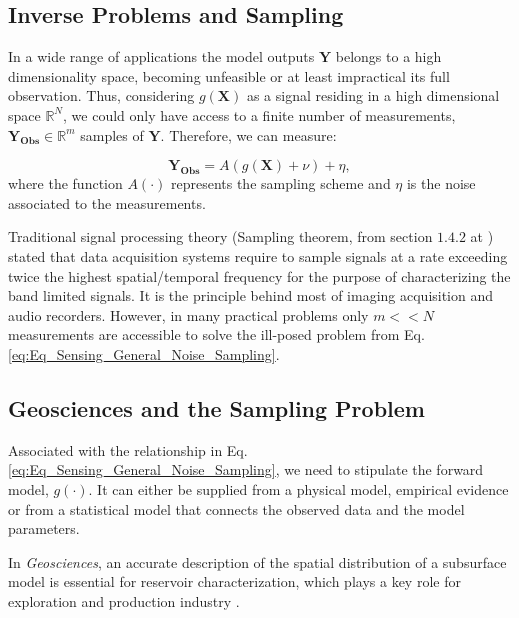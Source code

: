 \subsection{Inverse Problems and Sampling}
\label{sec_intro_Sensing}


In a wide range of applications the model outputs $\mathbf{Y}$ belongs to a high dimensionality space, becoming unfeasible or at least impractical its full observation. Thus, considering $g(\mathbf{X})$ as a signal residing in a high dimensional space $\mathbb{R}^{N}$, we could only have access to a finite number of measurements, $\mathbf{Y_{Obs}} \in \mathbb{R}^{m}$ samples of $\mathbf{Y}$. Therefore, we can measure:

\begin{equation}
\label{eq:Eq_Sensing_General_Noise_Sampling}
	\mathbf{Y_{Obs}} = A(g(\mathbf{X}) + \nu) +  \eta ,
\end{equation}
where the function $A(\cdot)$ represents the sampling scheme and $\eta$ is the noise associated to the measurements. 


Traditional signal processing theory (Sampling theorem, from section $1.4.2$ at \cite{Proakis_1996_a}) stated that data acquisition systems require to sample signals at a rate exceeding twice the highest spatial/temporal frequency for the purpose of characterizing the band limited signals. It is the principle behind most of imaging acquisition and audio recorders. However, in many practical problems only $m << N$ measurements are accessible to solve the ill-posed problem from Eq. \eqref{eq:Eq_Sensing_General_Noise_Sampling}. 


\subsection{Geosciences and the Sampling Problem}
\label{secGeoAndInvProblems}

Associated with the relationship in Eq. \eqref{eq:Eq_Sensing_General_Noise_Sampling}, we need to stipulate the forward model, $g(\cdot)$. It can either be supplied from a physical model, empirical evidence or from a statistical model that connects the observed data and the model parameters. 

In \textit{Geosciences}, an accurate description of the spatial distribution of a subsurface model is essential for reservoir characterization, which plays a key role for %
exploration and production industry \cite{Oliver_2008_a,Onwunalu09,GuyagulerBaris2002_a,BKMPW05,krause06near22,BKWSS06}. 

